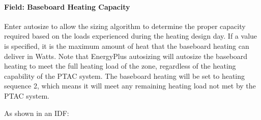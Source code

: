 \paragraph{Field: Baseboard Heating Capacity}\label{field-baseboard-heating-capacity-2}

Enter autosize to allow the sizing algorithm to determine the proper capacity required based on the loads experienced during the heating design day. If a value is specified, it is the maximum amount of heat that the baseboard heating can deliver in Watts. Note that EnergyPlus autosizing will autosize the baseboard heating to meet the full heating load of the zone, regardless of the heating capability of the PTAC system. The baseboard heating will be set to heating sequence 2, which means it will meet any remaining heating load not met by the PTAC system.

As shown in an IDF:

